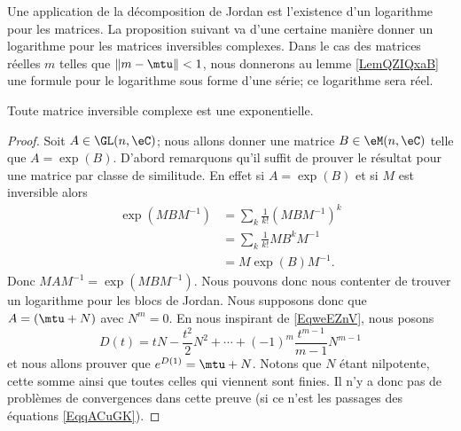 Une application de la décomposition de Jordan est l'existence d'un logarithme pour les matrices. La proposition suivant va d'une certaine manière donner un logarithme pour les matrices inversibles complexes. Dans le cas des matrices réelles \( m\) telles que \( \| m-\mtu \|<1\), nous donnerons au lemme \ref{LemQZIQxaB} une formule pour le logarithme sous forme d'une série; ce logarithme sera réel.
\begin{proposition} \label{PropKKdmnkD}
    Toute matrice inversible complexe est une exponentielle.
\end{proposition}

\begin{proof}
    Soit \( A\in \GL(n,\eC)\); nous allons donner une matrice \( B\in \eM(n,\eC)\) telle que \( A=\exp(B)\). D'abord remarquons qu'il suffit de prouver le résultat pour une matrice par classe de similitude. En effet si \( A=\exp(B)\) et si \( M\) est inversible alors 
    \begin{subequations}    \label{EqqACuGK}
        \begin{align}
            \exp(MBM^{-1})&=\sum_k\frac{1}{ k! }(MBM^{-1})^k\\
            &=\sum_k\frac{1}{ k! }MB^kM^{-1}\\
            &=M\exp(B)M^{-1}.
        \end{align}
    \end{subequations}
    Donc \( MAM^{-1}=\exp(MBM^{-1})\). Nous pouvons donc nous contenter de trouver un logarithme pour les blocs de Jordan. Nous supposons donc que \( A=(\mtu+N)\) avec \( N^m=0\). En nous inspirant de \eqref{EqweEZnV}, nous posons
    \begin{equation}
        D(t)=tN-\frac{ t^2 }{ 2 }N^2+\cdots +(-1)^m\frac{ t^{m-1} }{ m-1 }N^{m-1}
    \end{equation}
    et nous allons prouver que \(  e^{D(1)}=\mtu+N\). Notons que \( N\) étant nilpotente, cette somme ainsi que toutes celles qui viennent sont finies. Il n'y a donc pas de problèmes de convergences dans cette preuve (si ce n'est les passages des équations \eqref{EqqACuGK}).


\end{proof}

